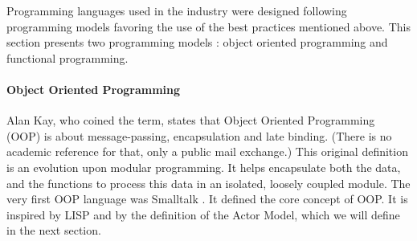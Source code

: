 Programming languages used in the industry were designed following programming models favoring the use of the best practices mentioned above.
This section presents two programming models : object oriented programming and functional programming.

\paragraph{Object Oriented Programming}


Alan Kay, who coined the term, states that Object Oriented Programming (OOP) is about message-passing, encapsulation and late binding.
(There is no academic reference for that, only a public mail exchange.)
This original definition is an evolution upon modular programming.
It helps encapsulate both the data, and the functions to process this data in an isolated, loosely coupled module.
The very first OOP language was Smalltalk \cite{Goldberg1984}.
It defined the core concept of OOP.
It is inspired by LISP and by the definition of the Actor Model, which we will define in the next section.


